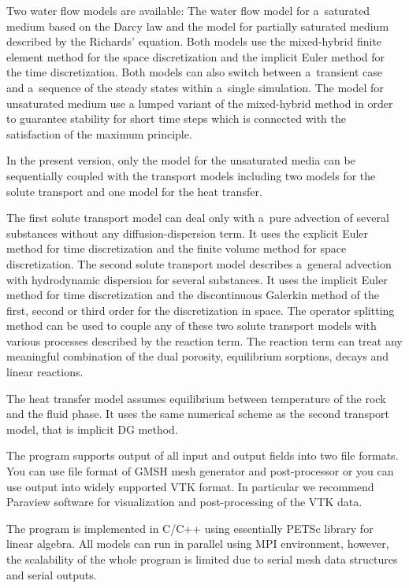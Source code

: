\documentclass[12pt,a4paper]{report}
\begin{document}
Two water flow models are available: The water flow model for a~saturated medium based on the Darcy law 
and the model for partially saturated medium described by the Richards' equation. 
Both models use the mixed-hybrid finite element method for the space discretization and the implicit Euler method for the time discretization. 
Both models can also switch between a~transient case and a~sequence of the steady states within a~single simulation. The model for unsaturated medium use 
a lumped variant of the mixed-hybrid method in order to guarantee stability for short time steps which is connected with the satisfaction of the maximum principle.

In the present version,  only the model for the unsaturated media can be sequentially coupled  with the transport models including 
two models for the solute transport and one model for the heat transfer.

The first solute transport model can deal only with a~pure advection of several substances without any diffusion-dispersion term. It uses 
the explicit Euler method for time discretization and the finite volume method for space discretization.
The second solute transport model describes a~general advection with hydrodynamic dispersion for several substances. 
It uses the implicit Euler method for time discretization and the discontinuous Galerkin method of
the first, second or third order for the discretization in space.
The operator splitting method can be used to couple any of these two solute transport models with  
 various processes described by the reaction term.  The reaction term can treat any meaningful combination of the dual porosity, 
equilibrium sorptions, decays and linear reactions. 

The heat transfer model assumes equilibrium between temperature of the rock and the fluid phase. It uses the same numerical scheme as the second transport model, 
that is implicit DG method.

The program supports output of all input and output fields into two file formats. You can use file format of GMSH mesh generator and post-processor 
or you can use output into widely supported VTK format. In particular we recommend Paraview software for visualization and post-processing of the VTK data.

The program is implemented in C/C++ using essentially PETSc library for linear algebra. All models can run in parallel using MPI environment, however, 
the scalability of the whole program is limited due to serial mesh data structures and serial outputs.
\end{document}
